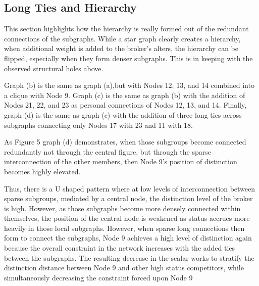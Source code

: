 \documentclass[12pt]{article}
\begin{document}


\subsection{Long Ties and Hierarchy}
This section highlights how the hierarchy is really formed out of the redundant connections of the subgraphs. While a star graph clearly creates a hierarchy, when additional weight is added to the broker's alters, the hierarchy can be flipped, especially when they form denser subgraphs. This is in keeping with the observed structural holes above. 

Graph (b) is the same as graph (a),but with Nodes 12, 13, and 14 combined into a clique with Node 9. Graph (c) is the same as graph (b) with the addition of Nodes 21, 22, and 23 as personal connections of Nodes 12, 13, and 14. Finally, graph (d) is the same as graph (c) with the addition of three long ties across subgraphs connecting only Nodes 17 with 23 and 11 with 18.

As Figure 5 graph (d) demonstrates, when those subgroups become connected redundantly not through the central figure, but through the sparse interconnection of the other members, then Node 9's position of distinction becomes highly elevated.

Thus, there is a U shaped pattern where at low levels of interconnection between sparse subgroups, mediated by a central node, the distinction level of the broker is high. However, as those subgraphs become more densely connected within themselves, the position of the central node is weakened as status accrues more heavily in those local subgraphs. However, when sparse long connections then form to connect the subgraphs, Node 9 achieves a high level of distinction again because the overall constraint in the network increases with the added ties between the subgraphs. The resulting decrease in the scalar works to stratify the distinction distance between Node 9 and other high status competitors, while simultaneously decreasing the constraint forced upon Node 9 
\end{document}
